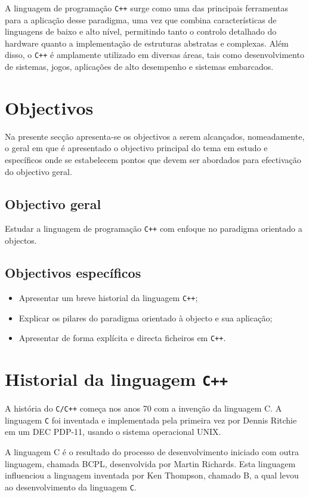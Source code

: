 \documentclass[a4paper,12pt]{article}
\begin{document}
A linguagem de programação \texttt{C++} surge como uma das principais ferramentas para a aplicação 
desse paradigma, uma vez que combina características de linguagens de baixo e alto nível, permitindo 
tanto o controlo detalhado do hardware quanto a implementação de estruturas abstratas e complexas. Além disso, 
o \texttt{C++} é amplamente utilizado em diversas áreas, tais como desenvolvimento de sistemas, jogos, aplicações 
de alto desempenho e sistemas embarcados. 


\newpage
\section{Objectivos}
Na presente secção apresenta-se os objectivos a serem 
alcançados, nomeadamente, o geral em que é apresentado o objectivo principal do tema em estudo e
 específicos onde se estabelecem pontos que devem ser abordados para efectivação do objectivo geral. 
\subsection{Objectivo geral}
Estudar a linguagem de programação \texttt{C++} com enfoque no paradigma 
orientado a objectos.
\subsection{Objectivos específicos}
\begin{itemize}
\item Apresentar um breve historial da linguagem \texttt{C++};
\item Explicar os pilares do paradigma orientado à objecto e sua aplicação;
\item Apresentar de forma explícita e directa ficheiros em \texttt{C++}.

\end{itemize}


\newpage

\section{Historial da linguagem \texttt{C++}}

A história do \texttt{C/C++} começa nos anos 70 com a invenção da linguagem C. 
A linguagem \texttt{C} foi inventada e implementada pela primeira vez por Dennis Ritchie 
em um DEC PDP-11, usando o sistema operacional UNIX.

A linguagem C é o resultado do processo de desenvolvimento iniciado com outra linguagem, chamada 
BCPL, desenvolvida por Martin Richards. Esta linguagem influenciou a linguagem 
inventada por Ken Thompson, chamado B, a qual levou ao desenvolvimento da 
linguagem \texttt{C}. 
\end{document}

